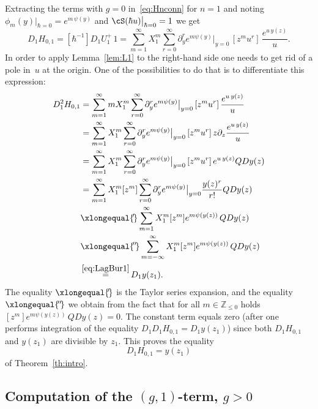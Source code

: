 Extracting the terms with $g=0$ in~\eqref{eq:Hnconn} for $n=1$ and noting $\phi_m(y)\big|_{\hbar=0}=e^{m\,\psi(y)}$ and $\cS(\hbar u)\big|_{\hbar=0}=1$ we get
\begin{equation*}
D_1H_{0,1}=[\hbar^{-1}]D_1U_1^+\,1=\sum_{m=1}^\infty X_1^m\sum_{r=0}^\infty\partial_y^r e^{m\psi(y)}\big|_{y=0}\,[z^mu^r]\,
\frac{e^{u\,y(z)}}{u}.
\end{equation*}
In order to apply Lemma~\ref{lem:L1} to the right-hand side one needs to get rid of a pole in~$u$ at the origin. One of the possibilities to do that is to differentiate this expression:
\begin{align*}
D_1^2H_{0,1}&=\sum_{m=1}^\infty m X_1^m\sum_{r=0}^\infty\partial_y^r e^{m\psi(y)}\big|_{y=0}\,[z^mu^r]\,
\frac{e^{u\,y(z)}}{u}
\\ &=
\sum_{m=1}^\infty X_1^m\sum_{r=0}^\infty\partial_y^r e^{m\psi(y)}\big|_{y=0}\,[z^mu^r]\,
z\partial_z\frac{e^{u\,y(z)}}{u}
\\ &=
\sum_{m=1}^\infty X_1^m\sum_{r=0}^\infty\partial_y^r e^{m\psi(y)}\big|_{y=0}\,[z^mu^r]\,e^{u\,y(z)}QDy(z)
\\ &=
\sum_{m=1}^\infty X_1^m[z^{m}]\sum_{r=0}^\infty
\partial_y^r e^{m\psi(y)}\big|_{y=0}\frac{y(z)^r}{r!}QDy(z)
\\ &\xlongequal{\!'\!}
\sum_{m=1}^\infty X_1^m[z^{m}] e^{m\psi(y(z))}\,QDy(z)
\\ &\xlongequal{\!''\!}
\sum_{m=-\infty}^\infty X_1^m[z^{m}] e^{m\psi(y(z))}\,QDy(z)
\\ &\mathop{=}^{\eqref{eq:LagBur1}}
D_1y(z_1).
\end{align*}
The equality $\xlongequal{\!'\!}$ is the Taylor series expansion, and the equality $\xlongequal{\!''\!}$ we obtain from the fact that for all $m\in \mathbb{Z}_{\leq 0}$ holds $[z^{m}] e^{m\psi(y(z))}\,QDy(z) =0$.
The constant term equals zero (after one performs integration of the equality $D_1D_1H_{0,1}=D_1 y(z_1)$) since both $D_1H_{0,1}$ and $y(z_1)$ are divisible by $z_1$. This proves the equality
\begin{equation*}
D_1H_{0,1}=y(z_1)
\end{equation*}
of Theorem~\ref{th:intro}.

\subsection{Computation of the \texorpdfstring{$(g,1)$}{(g,1)}-term, \texorpdfstring{$g>0$}{g>0}}

